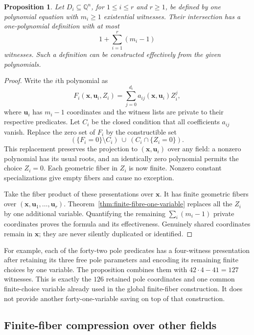 \documentclass[11pt]{article}
\newtheorem{proposition}[theorem]{Proposition}
\theoremstyle{definition}
\newcommand{\Q}{\mathbb Q}
\begin{document}
\begin{proposition}\label{prop:intersection-rank}
Let $D_i\subseteq\Q^n$, for $1\le i\le r$ and $r\ge1$, be
defined by one polynomial equation with $m_i\ge1$ existential
witnesses. Their intersection has a one-polynomial definition with at
most
\[
 1+\sum_{i=1}^r(m_i-1)
\]
witnesses. Such a definition can be constructed effectively from the
given polynomials.
\end{proposition}
\begin{proof}
Write the $i$th polynomial as
\[
 F_i(\mathbf x,\mathbf u_i,Z_i)
   =\sum_{j=0}^{d_i}a_{ij}(\mathbf x,\mathbf u_i)Z_i^j,
\]
where $\mathbf u_i$ has $m_i-1$ coordinates and the witness lists
are private to their respective predicates. Let $C_i$ be the closed
condition that all coefficients $a_{ij}$ vanish. Replace the zero set
of $F_i$ by the constructible set
\[
 (\{F_i=0\}\setminus C_i)\ \cup\ (C_i\cap\{Z_i=0\}).
\]
This replacement preserves the projection to
$(\mathbf x,\mathbf u_i)$ over any field: a nonzero polynomial has
its usual roots, and an identically zero polynomial permits the choice
$Z_i=0$. Each geometric fiber in $Z_i$ is now finite. Nonzero
constant specializations give empty fibers and cause no exception.

Take the fiber product of these presentations over $\mathbf x$.
It has finite geometric fibers over
$(\mathbf x,\mathbf u_1,\ldots,\mathbf u_r)$.
Theorem~\ref{thm:finite-fibre-one-variable} replaces all the $Z_i$
by one additional variable. Quantifying the remaining
$\sum_i(m_i-1)$ private coordinates proves the formula and its
effectiveness. Genuinely shared coordinates remain in $\mathbf x$;
they are never silently duplicated or identified.
\end{proof}

For example, each of the forty-two pole predicates has a four-witness
presentation after retaining its three free pole parameters and encoding
its remaining finite choices by one variable. The proposition combines
them with $42\cdot4-41=127$ witnesses. This is exactly the $126$
retained pole coordinates and one common finite-choice variable already
used in the global finite-fiber construction. It does not provide another
forty-one-variable saving on top of that construction.


\subsection{Finite-fiber compression over other fields}
\label{subsec:finite-fibre-fields}
\end{document}
